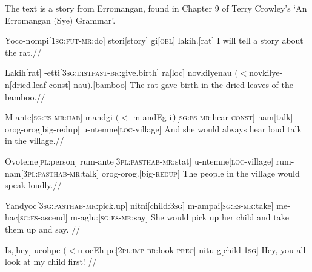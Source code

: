 \documentclass[12pt]{article}
\begin{document}


\bigskip

\noindent
The text is a story from Erromangan, found in Chapter 9 of Terry
Crowley's `An Erromangan (Sye) Grammar'.

\bigskip
\exdisplay
\begingl
Yoco-nompi[\textsc{1sg:fut-mr:}do]
stori[story]%
gi[\textsc{obl}]
lakih.[rat]
\endilg
\glft I will tell a story about the rat.//
\endgl
 \xe

\exdisplay
\begingl
Lakih[rat]
-etti[\textsc{3sg:distpast-br:}give.birth]
ra[\sc loc]
{novkilyenau $(<$novkilye-n}[dried.leaf-\sc const]
nau$)$.[bamboo]
\endilg
\glft The rat gave birth in the dried leaves of the bamboo.//
\endgl
\xe

\exdisplay\begingl
M-ante[\textsc{sg:es-mr:hab}]
{mandgi $(<$ m-andEg-i$\mskip2mu)$}[\textsc{sg:es-mr:}hear-\textsc{const}]
nam[talk]
orog-orog[big-\sc redup]
u-ntemne[\textsc{loc}-village]
\endilg
\glft And she would always hear loud talk in the village.//
\endgl
\xe

\exdisplay
\begingl
Ovoteme[\textsc{pl}:person]
rum-ante[\textsc{3pl:pasthab-mr:}stat]
u-ntemne[\textsc{loc}-village]
rum-nam[\textsc{3pl:pasthab-mr:}talk]
orog-orog.[big-\textsc{redup}]
\endilg
\glft The people in the village would speak loudly.//
\endgl
\xe

\exdisplay
\begingl
Yandyoc[\textsc{3sg:pasthab-mr:}pick.up]%
nitni[child:\textsc{3sg}]
m-ampai[\textsc{sg:es-mr:}take]
me-hac[\textsc{sg:es-}ascend]
m-aglu:[\textsc{sg:es-mr:}say]
\endilg
\glft She would pick up her child and take them up and say. //
\endgl
\xe

\exdisplay
\begingl
Is,[hey]
{ucohpe $(<$u-ocEh-pe}[\textsc{2pl:imp-br:}look\textsc{-prec}]
nitu-g[child\textsc{-1sg}]
\endilg
\glft Hey, you all look at my child first! //
\endgl
\xe
\end{document}
